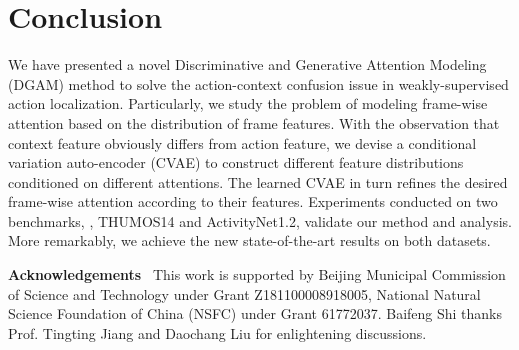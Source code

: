 \documentclass[10pt,twocolumn,letterpaper]{article}
\begin{document}
\section{Conclusion}

We have presented a novel Discriminative and Generative Attention Modeling (DGAM) method to solve the action-context confusion issue in weakly-supervised action localization.
Particularly, we study the problem of modeling frame-wise attention based on the distribution of frame features.
With the observation that context feature obviously differs from action feature, we devise a conditional variation auto-encoder (CVAE) to construct different feature distributions conditioned on different attentions.
The learned CVAE in turn refines the desired frame-wise attention according to their features.
Experiments conducted on two benchmarks, \ie, THUMOS14 and ActivityNet1.2, validate our method and analysis. More remarkably, we achieve the new state-of-the-art results on both datasets.

{\small \textbf{Acknowledgements}~ This work is supported by Beijing Municipal Commission of Science and Technology under Grant Z181100008918005, National Natural Science Foundation of China (NSFC) under Grant 61772037. Baifeng Shi thanks Prof. Tingting Jiang and Daochang Liu for enlightening discussions.}





{\small


}
\end{document}
